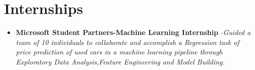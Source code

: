 \documentclass{article}
\begin{document}
    \section{Internships}
    \begin{itemize}
        \item{\textbf{\large{Microsoft Student Partners-Machine Learning Internship}}}
        \newline
        \textit{-Guided a team of 10 individuals to collaborate and accomplish a Regression task of price prediction of used cars in a machine learning pipeline through Exploratory Data Analysis,Feature Engineering and Model Building.}
    \end{itemize}
\end{document}
